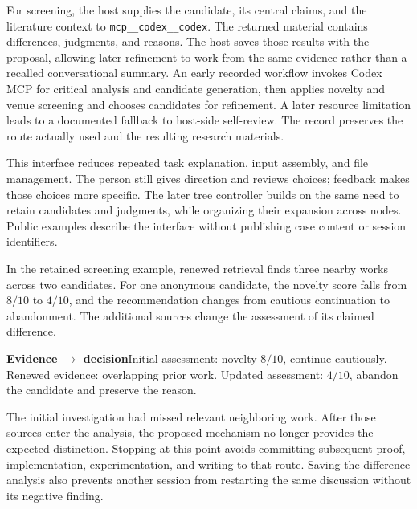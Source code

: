 For screening, the host supplies the candidate, its central claims, and the literature context to \texttt{mcp\_\_codex\_\_codex}. The returned material contains differences, judgments, and reasons. The host saves those results with the proposal, allowing later refinement to work from the same evidence rather than a recalled conversational summary.
An early recorded workflow invokes Codex MCP for critical analysis and candidate generation, then applies novelty and venue screening and chooses candidates for refinement. A later resource limitation leads to a documented fallback to host-side self-review. The record preserves the route actually used and the resulting research materials.

This interface reduces repeated task explanation, input assembly, and file management. The person still gives direction and reviews choices; feedback makes those choices more specific. The later tree controller builds on the same need to retain candidates and judgments, while organizing their expansion across nodes. Public examples describe the interface without publishing case content or session identifiers.

In the retained screening example, renewed retrieval finds three nearby works across two candidates. For one anonymous candidate, the novelty score falls from $8/10$ to $4/10$, and the recommendation changes from cautious continuation to abandonment. The additional sources change the assessment of its claimed difference.
\begin{insight}
\textbf{Evidence $\longrightarrow$ decision}\quad Initial assessment: novelty $8/10$, continue cautiously. Renewed evidence: overlapping prior work. Updated assessment: $4/10$, abandon the candidate and preserve the reason.
\end{insight}
The initial investigation had missed relevant neighboring work. After those sources enter the analysis, the proposed mechanism no longer provides the expected distinction. Stopping at this point avoids committing subsequent proof, implementation, experimentation, and writing to that route. Saving the difference analysis also prevents another session from restarting the same discussion without its negative finding.

